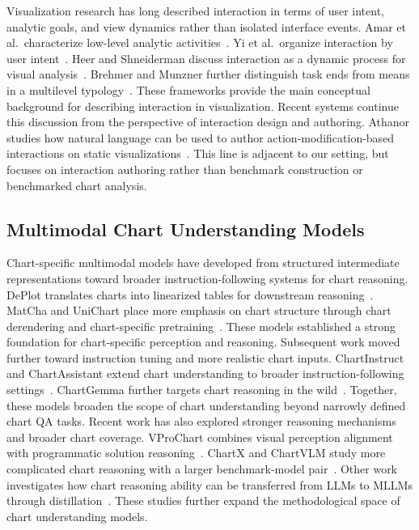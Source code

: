 \documentclass[review,journal,hideappendix]{vgtc} %
\begin{document}
Visualization research has long described interaction in terms of user intent, analytic goals, and view dynamics rather than isolated interface events. Amar et al.~characterize low-level analytic activities~\cite{amarLowLevelComponentsAnalytic2005}. Yi et al.~organize interaction by user intent~\cite{yiDeeperUnderstandingRole2007}. Heer and Shneiderman discuss interaction as a dynamic process for visual analysis~\cite{heerInteractiveDynamicsVisual2012}. Brehmer and Munzner further distinguish task ends from means in a multilevel typology~\cite{brehmerMultilevelTypologyAbstract2013}. These frameworks provide the main conceptual background for describing interaction in visualization.
Recent systems continue this discussion from the perspective of interaction design and authoring. Athanor studies how natural language can be used to author action-modification-based interactions on static visualizations~\cite{liuAthanorAuthoringAction2026}. This line is adjacent to our setting, but focuses on interaction authoring rather than benchmark construction or benchmarked chart analysis.


\subsection{Multimodal Chart Understanding Models}

Chart-specific multimodal models have developed from structured intermediate representations toward broader instruction-following systems for chart reasoning. DePlot translates charts into linearized tables for downstream reasoning~\cite{liuDePlotOneshotVisual2023}. MatCha and UniChart place more emphasis on chart structure through chart derendering and chart-specific pretraining~\cite{liuMatChaEnhancingVisual2023,masryUniChartUniversalVisionlanguage2023}. These models established a strong foundation for chart-specific perception and reasoning.
Subsequent work moved further toward instruction tuning and more realistic chart inputs. ChartInstruct and ChartAssistant extend chart understanding to broader instruction-following settings~\cite{masryChartInstructInstruction2024,mengChartAssistantUniversalChart2024}. ChartGemma further targets chart reasoning in the wild~\cite{masryChartGemmaVisual2024}. Together, these models broaden the scope of chart understanding beyond narrowly defined chart QA tasks.
Recent work has also explored stronger reasoning mechanisms and broader chart coverage. VProChart combines visual perception alignment with programmatic solution reasoning~\cite{huangVProChartAnsweringChart2025}. ChartX and ChartVLM study more complicated chart reasoning with a larger benchmark-model pair~\cite{xiaChartXChartVLMVersatile2025}. Other work investigates how chart reasoning ability can be transferred from LLMs to MLLMs through distillation~\cite{heDistillVisualChart2025}. These studies further expand the methodological space of chart understanding models.
\end{document}
